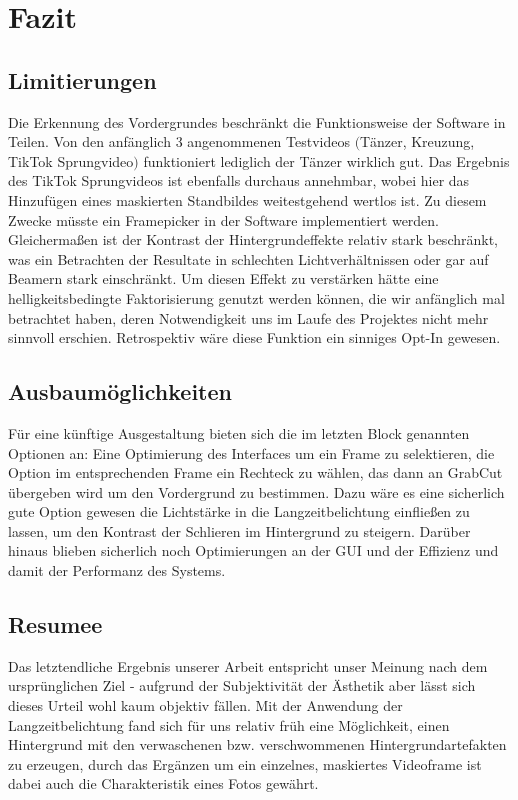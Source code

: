 \documentclass[12pt]{scrartcl}
\begin{document}
\section{Fazit}
\subsection{Limitierungen}
Die Erkennung des Vordergrundes beschr\"ankt die Funktionsweise der Software in Teilen. Von den anf\"anglich 3 angenommenen Testvideos
$ ( $T\"anzer, Kreuzung, TikTok Sprungvideo$ ) $ funktioniert lediglich der T\"anzer wirklich gut. Das Ergebnis des TikTok Sprungvideos ist
ebenfalls durchaus annehmbar, wobei hier das Hinzuf\"ugen eines maskierten Standbildes weitestgehend wertlos ist. Zu diesem Zwecke m\"usste ein Framepicker in der Software implementiert werden. Gleicherma{\ss}en ist der Kontrast der Hintergrundeffekte relativ stark beschr\"ankt, was ein Betrachten der Resultate in schlechten Lichtverh\"altnissen oder gar auf Beamern stark einschr\"ankt. Um diesen Effekt zu verst\"arken h\"atte eine helligkeitsbedingte Faktorisierung genutzt werden k\"onnen, die wir anf\"anglich mal betrachtet haben, deren Notwendigkeit uns im Laufe des Projektes nicht mehr sinnvoll erschien. Retrospektiv w\"are diese Funktion ein sinniges Opt-In gewesen.
\subsection{Ausbaum\"oglichkeiten}
F\"ur eine k\"unftige Ausgestaltung bieten sich die im letzten Block genannten Optionen an: Eine Optimierung des Interfaces um ein Frame zu selektieren, die Option im entsprechenden Frame ein Rechteck zu w\"ahlen, das dann an GrabCut \"ubergeben wird um den Vordergrund zu bestimmen. Dazu w\"are es eine sicherlich gute Option gewesen die Lichtst\"arke in die Langzeitbelichtung einflie{\ss}en zu lassen, um den Kontrast der Schlieren im Hintergrund zu steigern. Darüber hinaus blieben sicherlich noch Optimierungen an der GUI und der Effizienz und damit der Performanz des Systems.
\subsection{Resumee}
Das letztendliche Ergebnis unserer Arbeit entspricht unser Meinung nach dem urspr\"unglichen Ziel - aufgrund der Subjektivit\"at der
\"Asthetik aber l\"asst sich dieses Urteil wohl kaum objektiv f\"allen. Mit der Anwendung der Langzeitbelichtung fand sich f\"ur uns relativ
fr\"uh eine M\"oglichkeit, einen Hintergrund mit den verwaschenen bzw. verschwommenen Hintergrundartefakten zu erzeugen, durch das Erg\"anzen um ein einzelnes, maskiertes Videoframe ist dabei auch die Charakteristik eines Fotos gewährt.
\end{document}
